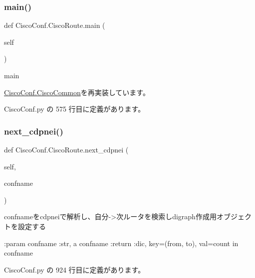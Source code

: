 \subsubsection{\texorpdfstring{main()}{main()}}
{\footnotesize\ttfamily def Cisco\+Conf.\+Cisco\+Route.\+main (\begin{DoxyParamCaption}\item[{}]{self }\end{DoxyParamCaption})}

\begin{DoxyVerb}main
\end{DoxyVerb}
 

\mbox{\hyperlink{classCiscoConf_1_1CiscoCommon_a1bfe0207baec9f926f5dbea8c0f9e503}{Cisco\+Conf.\+Cisco\+Common}}を再実装しています。



 Cisco\+Conf.\+py の 575 行目に定義があります。

\mbox{\label{classCiscoConf_1_1CiscoRoute_a987ecf2aab407917590d6741954ec008}} 
\subsubsection{\texorpdfstring{next\_cdpnei()}{next\_cdpnei()}}
{\footnotesize\ttfamily def Cisco\+Conf.\+Cisco\+Route.\+next\+\_\+cdpnei (\begin{DoxyParamCaption}\item[{}]{self,  }\item[{}]{confname }\end{DoxyParamCaption})}

\begin{DoxyVerb}confnameをcdpneiで解析し、自分->次ルータを検索しdigraph作成用オブジェクトを設定する

:param  confname :str, a confname
:return :dic, key=(from, to), val=count in confname
\end{DoxyVerb}
 

 Cisco\+Conf.\+py の 924 行目に定義があります。

\mbox{\label{classCiscoConf_1_1CiscoRoute_aacb6440961bd868ec0f577b9b490324f}} 
